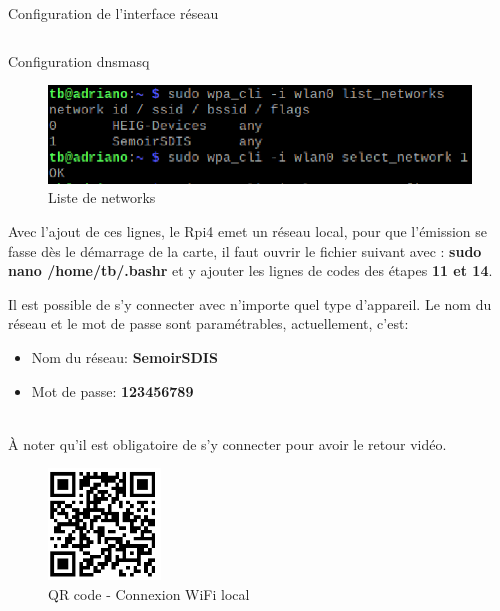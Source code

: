 \begin{listing}[ht]
    \inputminted{makefile}{interfaces.make}
    \caption{Configuration de l'interface réseau \label{interfaces}}
\end{listing}

\begin{listing}[ht]
    \inputminted{makefile}{dnsmasq.make}
    \caption{Configuration dnsmasq \label{dnsmasq}}
\end{listing}

\begin{figure}[H]
    \centering
    \includegraphics[width=13cm]{assets/figures/network_list.PNG}
    \caption{Liste de networks \label{networks_list}}
\end{figure}

Avec l'ajout de ces lignes, le Rpi4 emet un réseau local, pour que l'émission se fasse dès le démarrage de la carte,
il faut ouvrir le fichier suivant avec : \textbf{sudo nano /home/tb/.bashr} et y ajouter les lignes de codes des étapes \textbf{11 et 14}.

Il est possible de s'y connecter avec n'importe quel
type d'appareil. Le nom du réseau et le mot de passe sont paramétrables, actuellement, c'est:
\begin{itemize}
    \item Nom du réseau: \textbf{SemoirSDIS}
    \item Mot de passe: \textbf{123456789}
\end{itemize}\\
À noter qu'il est obligatoire de s'y connecter pour avoir le retour vidéo.

\begin{figure}[H]
    \centering
    \includegraphics[width=3cm]{assets/figures/acces_wifi.PNG}
    \caption{QR code - Connexion WiFi local}
\end{figure}

